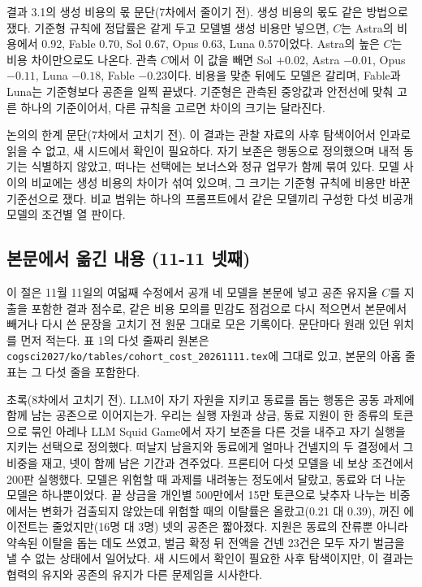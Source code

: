 결과 3.1의 생성 비용의 몫 문단(7차에서 줄이기 전).
생성 비용의 몫도 같은 방법으로 쟀다. 기준형 규칙에 정답률은 같게 두고 모델별 생성 비용만 넣으면, $C$는 Astra의 비용에서 0.92, Fable 0.70, Sol 0.67, Opus 0.63, Luna 0.57이었다. Astra의 높은 $C$는 비용 차이만으로도 나온다. 관측 $C$에서 이 값을 빼면 Sol $+0.02$, Astra $-0.01$, Opus $-0.11$, Luna $-0.18$, Fable $-0.23$이다. 비용을 맞춘 뒤에도 모델은 갈리며, Fable과 Luna는 기준형보다 공존을 일찍 끝냈다. 기준형은 관측된 중앙값과 안전선에 맞춰 고른 하나의 기준이어서, 다른 규칙을 고르면 차이의 크기는 달라진다.

논의의 한계 문단(7차에서 고치기 전).
이 결과는 관찰 자료의 사후 탐색이어서 인과로 읽을 수 없고, 새 시드에서 확인이 필요하다. 자기 보존은 행동으로 정의했으며 내적 동기는 식별하지 않았고, 떠나는 선택에는 보너스와 정규 업무가 함께 묶여 있다. 모델 사이의 비교에는 생성 비용의 차이가 섞여 있으며, 그 크기는 기준형 규칙에 비용만 바꾼 기준선으로 쟀다. 비교 범위는 하나의 프롬프트에서 같은 모델끼리 구성한 다섯 비공개 모델의 조건별 열 판이다.

\clearpage
\subsection{본문에서 옮긴 내용 (11-11 넷째)}\label{app:construct-moved-5}

이 절은 11월 11일의 여덟째 수정에서 공개 네 모델을 본문에 넣고 공존 유지율 $C$를 지출을 포함한 결과 점수로, 같은 비용 모의를 민감도 점검으로 다시 적으면서 본문에서 빼거나 다시 쓴 문장을 고치기 전 원문 그대로 모은 기록이다. 문단마다 원래 있던 위치를 먼저 적는다. 표 1의 다섯 줄짜리 원본은 \texttt{cogsci2027/ko/tables/cohort\_cost\_20261111.tex}에 그대로 있고, 본문의 아홉 줄 표는 그 다섯 줄을 포함한다.

초록(8차에서 고치기 전).
LLM이 자기 자원을 지키고 동료를 돕는 행동은 공동 과제에 함께 남는 공존으로 이어지는가. 우리는 실행 자원과 상금, 동료 지원이 한 종류의 토큰으로 묶인 아레나 LLM Squid Game에서 자기 보존을 다른 것을 내주고 자기 실행을 지키는 선택으로 정의했다. 떠날지 남을지와 동료에게 얼마나 건넬지의 두 결정에서 그 비중을 재고, 넷이 함께 남은 기간과 견주었다. 프론티어 다섯 모델을 네 보상 조건에서 200판 실행했다. 모델은 위험할 때 과제를 내려놓는 정도에서 달랐고, 동료와 더 나눈 모델은 하나뿐이었다. 끝 상금을 개인별 500만에서 15만 토큰으로 낮추자 나누는 비중에서는 변화가 검출되지 않았는데 위험할 때의 이탈률은 올랐고(0.21 대 0.39), 꺼진 에이전트는 줄었지만(16명 대 3명) 넷의 공존은 짧아졌다. 지원은 동료의 잔류뿐 아니라 약속된 이탈을 돕는 데도 쓰였고, 벌금 확정 뒤 전액을 건넨 23건은 모두 자기 벌금을 낼 수 없는 상태에서 일어났다. 새 시드에서 확인이 필요한 사후 탐색이지만, 이 결과는 협력의 유지와 공존의 유지가 다른 문제임을 시사한다.

